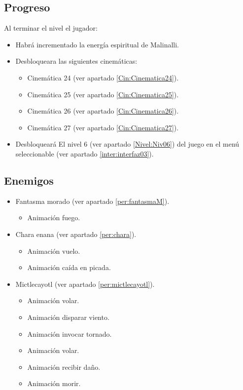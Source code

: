         \subsection{Progreso}
        Al terminar el nivel el jugador:
\begin{itemize}
        \item Habrá incrementado la energía espiritual de Malinalli. 
        \item Desbloqueara las siguientes cinemáticas:
\begin{itemize}
        \item Cinemática 24 (ver apartado \ref{Cin:Cinematica24}). 
        \item Cinemática 25 (ver apartado \ref{Cin:Cinematica25}).
        \item Cinemática 26 (ver apartado \ref{Cin:Cinematica26}).
        \item Cinemática 27 (ver apartado \ref{Cin:Cinematica27}).
\end{itemize}
        \item Desbloqueará El nivel 6 (ver apartado  \ref{Nivel:Niv06}) del juego en el menú seleccionable (ver apartado \ref{inter:interfaz03}).
\end{itemize}

        \subsection{Enemigos}
\begin{itemize}
        \item Fantasma morado (ver apartado \ref{per:fantasmaM}).
        \begin{itemize}
				\item Animación fuego.
		\end{itemize}
        \item Chara enana  (ver apartado \ref{per:chara}).
        \begin{itemize}
				\item Animación vuelo.
				\item Animación caída en picada.
		\end{itemize}
		\item Mictlecayotl (ver apartado \ref{per:mictlecayotl}).
\begin{itemize}
        \item Animación volar.
        \item Animación disparar viento.
        \item Animación invocar tornado.
        \item Animación volar.
        \item Animación recibir daño.
		\item Animación morir.
\end{itemize}			
\end{itemize}
